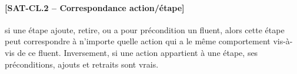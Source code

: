 {\paragraph*{[SAT-CL.2 -- Correspondance action/étape]} si une étape ajoute, retire, ou a
  pour précondition un fluent, alors cette étape peut correspondre à n'importe
  quelle action qui a le même comportement vis-à-vis de ce fluent. Inversement,
  si une action appartient à une étape, ses préconditions, ajouts et retraits
  sont vrais.



}
